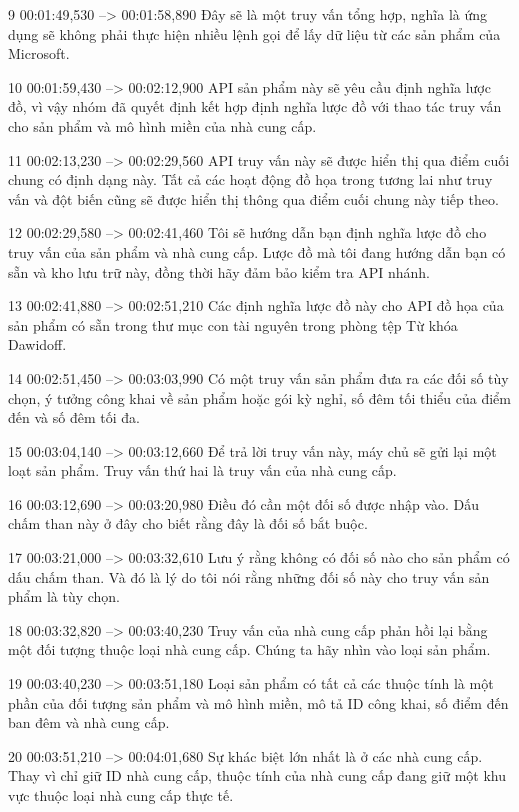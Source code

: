 9
00:01:49,530 --> 00:01:58,890
Đây sẽ là một truy vấn tổng hợp, nghĩa là ứng dụng sẽ không phải thực hiện nhiều lệnh gọi để lấy dữ liệu từ các sản phẩm của Microsoft.

10
00:01:59,430 --> 00:02:12,900
API sản phẩm này sẽ yêu cầu định nghĩa lược đồ, vì vậy nhóm đã quyết định kết hợp định nghĩa lược đồ với thao tác truy vấn cho sản phẩm và mô hình miền của nhà cung cấp.

11
00:02:13,230 --> 00:02:29,560
API truy vấn này sẽ được hiển thị qua điểm cuối chung có định dạng này.  Tất cả các hoạt động đồ họa trong tương lai như truy vấn và đột biến cũng sẽ được hiển thị thông qua điểm cuối chung này tiếp theo.

12
00:02:29,580 --> 00:02:41,460
Tôi sẽ hướng dẫn bạn định nghĩa lược đồ cho truy vấn của sản phẩm và nhà cung cấp.  Lược đồ mà tôi đang hướng dẫn bạn có sẵn và kho lưu trữ này, đồng thời hãy đảm bảo kiểm tra API nhánh.

13
00:02:41,880 --> 00:02:51,210
Các định nghĩa lược đồ này cho API đồ họa của sản phẩm có sẵn trong thư mục con tài nguyên trong phòng tệp Từ khóa Dawidoff.

14
00:02:51,450 --> 00:03:03,990
Có một truy vấn sản phẩm đưa ra các đối số tùy chọn, ý tưởng công khai về sản phẩm hoặc gói kỳ nghỉ, số đêm tối thiểu của điểm đến và số đêm tối đa.

15
00:03:04,140 --> 00:03:12,660
Để trả lời truy vấn này, máy chủ sẽ gửi lại một loạt sản phẩm.  Truy vấn thứ hai là truy vấn của nhà cung cấp.

16
00:03:12,690 --> 00:03:20,980
Điều đó cần một đối số được nhập vào. Dấu chấm than này ở đây cho biết rằng đây là đối số bắt buộc.

17
00:03:21,000 --> 00:03:32,610
Lưu ý rằng không có đối số nào cho sản phẩm có dấu chấm than.  Và đó là lý do tôi nói rằng những đối số này cho truy vấn sản phẩm là tùy chọn.

18
00:03:32,820 --> 00:03:40,230
Truy vấn của nhà cung cấp phản hồi lại bằng một đối tượng thuộc loại nhà cung cấp.  Chúng ta hãy nhìn vào loại sản phẩm.

19
00:03:40,230 --> 00:03:51,180
Loại sản phẩm có tất cả các thuộc tính là một phần của đối tượng sản phẩm và mô hình miền, mô tả ID công khai, số điểm đến ban đêm và nhà cung cấp.

20
00:03:51,210 --> 00:04:01,680
Sự khác biệt lớn nhất là ở các nhà cung cấp.  Thay vì chỉ giữ ID nhà cung cấp, thuộc tính của nhà cung cấp đang giữ một khu vực thuộc loại nhà cung cấp thực tế.

